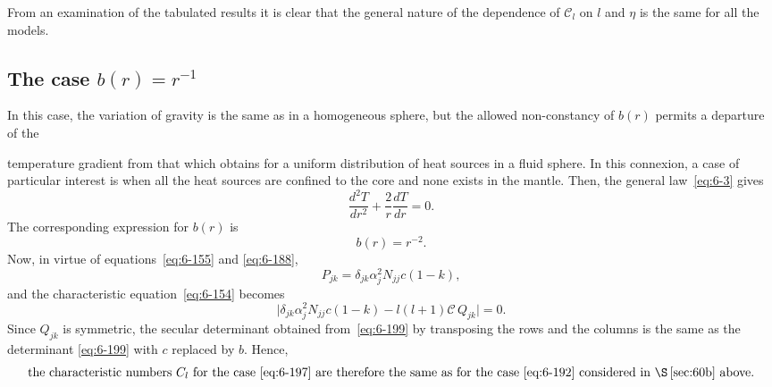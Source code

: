 From an examination of the tabulated results it is clear that the general
nature of the dependence of $\mathcal{C}_l$ on $l$ and $\eta$ is the same for all the models.

\subsection{The case $b(r) = r^{-1}$}\label{sec:60c}
In this case, the variation of gravity is the same as in a homogeneous
sphere, but the allowed non-constancy of $b(r)$ permits a departure of the

temperature gradient from that which obtains for a uniform distribution
of heat sources in a fluid sphere. In this connexion, a case of particular
interest is when all the heat sources are confined to the core and none
exists in the mantle. Then, the general law~\eqref{eq:6-3} gives
\begin{equation}\label{eq:6-196}
\frac{d^2 T}{dr^2} + \frac{2}{r}\frac{dT}{dr} = 0.
\end{equation}
The corresponding expression for $b(r)$ is
\begin{equation}\label{eq:6-197}
b(r) = r^{-2}.
\end{equation}
Now, in virtue of equations~\eqref{eq:6-155} and \eqref{eq:6-188},
\begin{equation}\label{eq:6-198}
P_{jk} = \delta_{jk}\alpha_j^2 N_{jj}c(1-k),
\end{equation}
and the characteristic equation~\eqref{eq:6-154} becomes
\begin{equation}\label{eq:6-199}
\bigl|\delta_{jk}\alpha_j^2 N_{jj}c(1-k) - l(l+1)\mathcal{C}\,Q_{jk}\bigr| = 0.
\end{equation}
Since $Q_{jk}$ is symmetric, the secular determinant obtained from~\eqref{eq:6-199} by
transposing the rows and the columns is the same as the determinant
\eqref{eq:6-199} with $c$ replaced by $b$. Hence,
\begin{equation}\label{eq:6-200}
\text{the characteristic numbers } \mathcal{C}_l \text{ for the case~\eqref{eq:6-197}} \text{ are therefore the same
as for the case~\eqref{eq:6-192}} \text{ considered in \S\,\ref{sec:60b} above.}
\end{equation}

